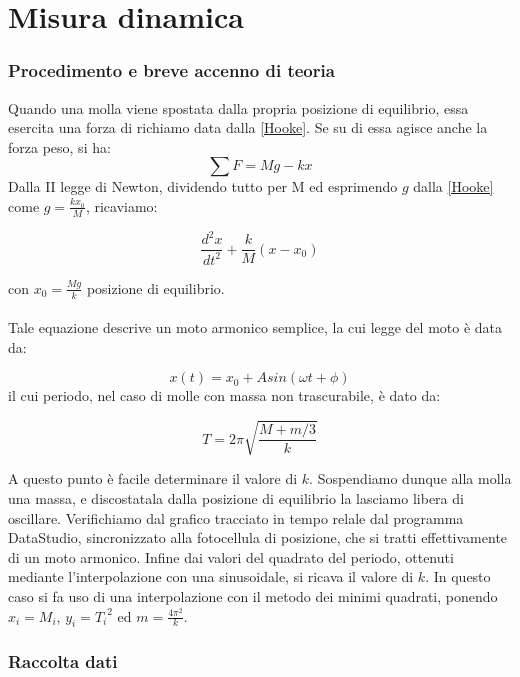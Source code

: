 
\section{Misura dinamica}

\subsubsection{Procedimento e breve accenno di teoria}

Quando una molla viene spostata dalla propria posizione di equilibrio, essa esercita una forza di richiamo data dalla \ref{Hooke}. Se su di essa agisce anche la forza peso, si ha:
$$\displaystyle\sum{F}=Mg-kx$$
Dalla II legge di Newton, dividendo tutto per M ed esprimendo $g$ dalla \ref{Hooke} come $g=\displaystyle{\frac{kx_0}{M}}$, ricaviamo:

\begin{equation}
\frac{d^2x}{dt^2}+\frac{k}{M}(x-x_0)
\end{equation}

con $x_0=\displaystyle{\frac{Mg}{k}}$ posizione di equilibrio.\\
\\
Tale equazione descrive un moto armonico semplice, la cui legge del moto è data da:

\begin{equation}\label{eqmoto}
x(t)=x_0+Asin(\omega t+\phi)
\end{equation} 
il cui periodo, nel caso di molle con massa non trascurabile, è dato da:

\begin{equation}\label{periodo}
T=2\pi\sqrt{\frac{M+m/3}{k}}
\end{equation}  

A questo punto è facile determinare il valore di $k$. Sospendiamo dunque alla molla una massa, e discostatala dalla posizione di equilibrio la lasciamo libera di oscillare. Verifichiamo dal grafico tracciato in tempo relale dal programma DataStudio, sincronizzato alla fotocellula di posizione, che si tratti effettivamente di un moto armonico. Infine dai valori del quadrato del periodo, ottenuti mediante l'interpolazione con una sinusoidale, si ricava il valore di $k$. In questo caso si fa uso di una interpolazione con il metodo dei minimi quadrati, ponendo $x_i=M_i$, $y_i={T_i}^2$ ed $m=\displaystyle{\frac{4\pi^2}{k}}$. 

\subsubsection{Raccolta dati}

